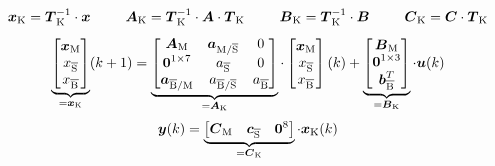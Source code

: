 \begin{equation}
\boldsymbol{x}_{\text{K}} = \boldsymbol{T}^{-1}_{\text{K}}\cdot \boldsymbol{x}\hspace{25pt} \boldsymbol{A}_{\text{K}} = \boldsymbol{T}^{-1}_{\text{K}}\cdot \boldsymbol{A}\cdot \boldsymbol{T}_{\text{K}} \hspace{25pt} \boldsymbol{B}_{\text{K}} = \boldsymbol{T}^{-1}_{\text{K}}\cdot \boldsymbol{B} \hspace{25pt} \boldsymbol{C}_{\text{K}} = \boldsymbol{C}\cdot \boldsymbol{T}_{\text{K}}
\end{equation}
\begin{equation}
\underbrace{\begin{bmatrix}
\boldsymbol{x}_\text{M} \\ x_{\overline{\text{S}}} \\ x_{\overline{\text{B}}}
\end{bmatrix}}_{= \boldsymbol{x}_{\text{K}}}(k+1) = 
\underbrace{\begin{bmatrix}
\boldsymbol{A}_\text{M} & \boldsymbol{a}_{\text{M}/\overline{\text{S}}} & 0 \\
\boldsymbol{0}^{1\times 7} & a_{\overline{\text{S}}} & 0 \\
\boldsymbol{a}_{\overline{\text{B}}/\text{M}} & a_{\overline{\text{B}}/\overline{\text{S}}} & a_{\overline{\text{B}}}
\end{bmatrix}}_{= \boldsymbol{A}_{\text{K}}}\cdot \begin{bmatrix}
\boldsymbol{x}_\text{M} \\ x_{\overline{\text{S}}} \\ x_{\overline{\text{B}}}
\end{bmatrix}(k) + 
\underbrace{\begin{bmatrix}
\boldsymbol{B}_\text{M} \\ \boldsymbol{0}^{1\times 3} \\ \boldsymbol{b}^{T}_{\overline{\text{B}}}
\end{bmatrix}}_{=\boldsymbol{B}_{\text{K}}}\cdot \boldsymbol{u}(k)
\end{equation}
\begin{equation}
\boldsymbol{y}(k) = \underbrace{\begin{bmatrix}
\boldsymbol{C}_\text{M}  & \boldsymbol{c}_{\overline{\text{S}}} & \boldsymbol{0}^8
\end{bmatrix}}_{=\boldsymbol{C}_{\text{K}}}\cdot \boldsymbol{x}_\text{K}(k)
\end{equation}
